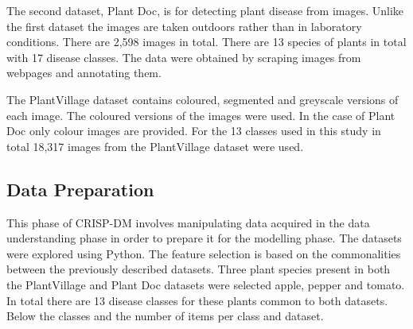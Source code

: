 \documentclass[conference]{IEEEtran}
\begin{document}
The second dataset, Plant Doc\cite{kaggledatasetPlantDoc}, is for detecting plant disease from images. Unlike the first dataset the images are taken outdoors rather than in laboratory conditions. There are 2,598 images in total. There are 13 species of plants in total with 17 disease classes. The data were obtained by scraping images from webpages and annotating them. 

The PlantVillage dataset contains coloured, segmented and greyscale versions of each image. The coloured versions of the images were used. In the case of Plant Doc only colour images are provided. For the 13 classes used in this study in total 18,317 images from the PlantVillage dataset were used.  
\subsection{Data Preparation}
This phase of CRISP-DM involves manipulating data acquired in the data understanding phase in order to prepare it for the modelling phase. The datasets were explored using Python. The feature selection is based on the commonalities between the previously described datasets. Three plant species present in both the PlantVillage and Plant Doc datasets were selected apple, pepper and tomato. In total there are 13 disease classes for these plants common to both datasets. Below the classes and the number of items per class and dataset. 
\end{document}
